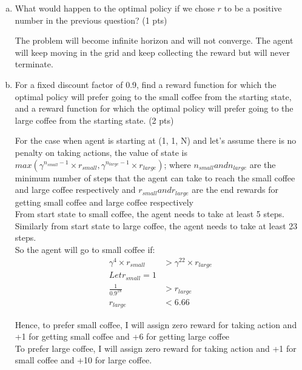 \documentclass[12pt]{article}
\begin{document}
\begin{enumerate}[a)]
\item What would happen to the optimal policy if we chose $r$ to be a positive number in the previous question? (1 pts)

\begin{solution}
The problem will become infinite horizon and will not converge. The agent will keep moving in the grid and keep collecting the reward but will never terminate.
\end{solution}

\item For a fixed discount factor of 0.9, find a reward function for which the optimal policy will prefer going to the small coffee from the starting state, and a reward function for which the optimal policy will prefer going to the large coffee from the starting state. (2 pts)

\begin{solution}
For the case  when agent is starting at (1, 1, N) and let's assume there is no penalty on taking actions, the value of state is $max(\gamma^{n_{small} -1} \times r_{small}, \gamma^{n_{large} -1} \times r_{large})$; where $n_{small} and n_{large}$ are the minimum number of steps that the agent can take to reach the small coffee and large coffee respectively and $r_{small} and r_{large}$ are the end rewards for getting small coffee and large coffee respectively\\
From start state to small coffee, the agent needs to take at least 5 steps. Similarly from start state to large coffee, the agent needs to take at least 23 steps.\\
So the agent will go to small coffee if:
\begin{align} 
\gamma^4 \times r_{small} &> \gamma^{22} \times r_{large} \\
Let r_{small} = 1 \\
\frac{1}{0.9^{18}} &> r_{large}\\
r_{large} &< 6.66
\end{align}

Hence, to prefer small coffee, I will assign zero reward for taking action and +1 for getting small coffee and +6 for getting large coffee\\

To prefer large coffee, I will assign zero reward for taking action and +1 for small coffee and +10 for large coffee.
\end{solution}

\end{enumerate}
\end{document}
